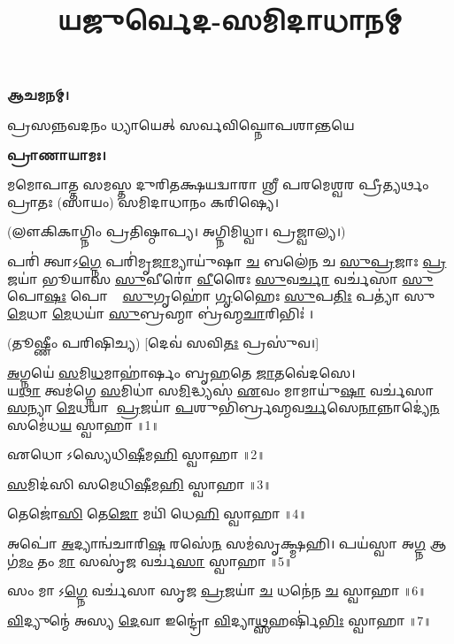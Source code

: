 \setmainfont[Scale=0.50,Script=Grantha,Mapping=tex-text,Mapping=devanagarinumerals,AutoFakeBold=2.0]{Noto Serif Grantha}
\title{\Huge 𑌯𑌜𑍁𑌰𑍍𑌵𑍇𑌦-𑌸𑌮𑌿𑌦𑌾𑌧𑌾𑌨𑌮𑍍}
\date{}
\maketitle
\tableofcontents 

\clearpage
{}

\textbf{𑌆𑌚𑌮𑌨𑌮𑍍।}

{𑌪𑍍𑌰𑌸𑌨𑍍𑌨𑌵𑌦𑌨𑌂 𑌧𑍍𑌯𑌾𑌯𑍇𑌤𑍍 𑌸𑌰𑍍𑌵𑌵𑌿𑌘𑍍𑌨𑍋𑌪𑌶𑌾𑌨𑍍𑌤𑌯𑍇}
 
\textbf{𑌪𑍍𑌰𑌾𑌣𑌾𑌯𑌾𑌮𑌃।} 

𑌮𑌮𑍋𑌪𑌾𑌤𑍍𑌤 𑌸𑌮𑌸𑍍𑌤 𑌦𑍁𑌰𑌿𑌤𑌕𑍍𑌷𑌯𑌦𑍍𑌵𑌾𑌰𑌾 𑌶𑍍𑌰𑍀 𑌪𑌰𑌮𑍇𑌶𑍍𑌵𑌰 𑌪𑍍𑌰𑍀𑌤𑍍𑌯𑌰𑍍𑌥𑌂 𑌪𑍍𑌰𑌾𑌤𑌃 (𑌸𑌾𑌯𑌂) 𑌸𑌮𑌿𑌦𑌾𑌧𑌾𑌨𑌂 𑌕𑌰𑌿𑌷𑍍𑌯𑍇।

(𑌲𑍗𑌕𑌿𑌕𑌾𑌗𑍍𑌨𑌿𑌂 𑌪𑍍𑌰𑌤𑌿𑌷𑍍𑌠𑌾𑌪𑍍𑌯। 𑌅𑌗𑍍𑌨𑌿𑌮𑌿𑌧𑍍𑌵𑌾। 𑌪𑍍𑌰𑌜𑍍𑌵𑌾𑌲𑍍𑌯।)

𑌪𑌰𑌿॑ 𑌤𑍍𑌵𑌾𑌽\ul{𑌗𑍍𑌨𑍇} 𑌪𑌰𑌿॑𑌮𑍃\ul{𑌜𑌾}𑌮𑍍𑌯𑌾𑌯𑍁॑𑌷𑌾 \ul{𑌚} 𑌬𑌲𑍇॑𑌨 𑌚 \ul{𑌸𑍁}\ul{𑌪𑍍𑌰}𑌜𑌾𑌃 \ul{𑌪𑍍𑌰}𑌜𑌯𑌾॑ 𑌭𑍂𑌯𑌾𑌸 \ul{𑌸𑍁}𑌵𑍀𑌰𑍋॑ \ul{𑌵𑍀}𑌰𑍈𑌃 \ul{𑌸𑍁}𑌵\ul{𑌰𑍍𑌚𑌾} 𑌵𑌰𑍍𑌚॑𑌸𑌾 \ul{𑌸𑍁}𑌪𑍋\ul{𑌷𑌃} 𑌪𑍋𑌷𑍈𑌃᳚ \ul{𑌸𑍁}𑌗𑍃𑌹𑍋॑ \ul{𑌗𑍃}𑌹𑍈𑌃 \ul{𑌸𑍁}𑌪\ul{𑌤𑌿𑌃} 𑌪𑌤𑍍𑌯𑌾॑ 𑌸𑍁\ul{𑌮𑍇}𑌧𑌾 \ul{𑌮𑍇}𑌧𑌯𑌾॑ \ul{𑌸𑍁}𑌬𑍍𑌰𑌹𑍍𑌮𑌾 𑌬𑍍𑌰॑𑌹𑍍𑌮\ul{𑌚𑌾}𑌰𑌿𑌭𑌿𑌃॑ ।

(𑌤𑍂𑌷𑍍𑌣𑍀𑌂 𑌪𑌰𑌿𑌷𑌿𑌚𑍍𑌯) [𑌦𑍇𑌵॑ 𑌸𑌵𑌿\ul{𑌤𑌃} 𑌪𑍍𑌰𑌸𑍁॑𑌵।]

\ul{𑌅}𑌗𑍍𑌨𑌯𑍇॑ \ul{𑌸}𑌮𑌿\ul{𑌧}𑌮𑌾𑌹𑌾॑𑌰𑍍\mbox{}𑌷𑌂 𑌬𑍃\ul{𑌹}𑌤𑍇 \ul{𑌜𑌾}𑌤𑌵𑍇॑𑌦𑌸𑍇।\\
𑌯\ul{𑌥𑌾} 𑌤𑍍𑌵𑌮॑𑌗𑍍𑌨𑍇 \ul{𑌸}𑌮𑌿𑌧𑌾॑ 𑌸\ul{𑌮𑌿}𑌦𑍍𑌧𑍍𑌯𑌸॑ \ul{𑌏}𑌵𑌂 𑌮𑌾𑌮𑌾𑌯𑍁॑\ul{𑌷𑌾} 𑌵𑌰𑍍𑌚॑𑌸𑌾 \ul{𑌸}𑌨𑍍𑌯𑌾 \ul{𑌮𑍇}𑌧𑌯𑌾 \ul{𑌪𑍍𑌰}𑌜𑌯𑌾॑ \ul{𑌪}𑌶𑍁𑌭𑌿॑𑌰𑍍𑌬𑍍𑌰𑌹𑍍𑌮𑌵\ul{𑌰𑍍𑌚}𑌸𑍇\ul{𑌨𑌾}𑌨𑍍𑌨𑌾𑌦𑍍𑌯𑍇॑\ul{𑌨} 𑌸𑌮𑍇॑𑌧\ul{𑌯} 𑌸𑍍𑌵𑌾𑌹𑌾॥1॥

𑌏𑌧𑍋𑌽𑌸𑍍𑌯𑍇𑌧𑌿\ul{𑌷𑍀}𑌮\ul{𑌹𑌿} 𑌸𑍍𑌵𑌾𑌹𑌾॥2॥

\ul{𑌸}𑌮𑌿𑌦॑𑌸𑌿 𑌸𑌮𑍇𑌧𑌿\ul{𑌷𑍀}𑌮\ul{𑌹𑌿} 𑌸𑍍𑌵𑌾𑌹𑌾॥3॥

𑌤𑍇𑌜𑍋॑\ul{𑌸𑌿} 𑌤𑍇\ul{𑌜𑍋} 𑌮𑌯𑌿॑ 𑌧𑍇\ul{𑌹𑌿} 𑌸𑍍𑌵𑌾𑌹𑌾॥4॥

𑌅𑌪𑍋॑ \ul{𑌅}𑌦𑍍𑌯𑌾𑌨𑍍𑌵॑𑌚𑌾𑌰𑌿\ul{𑌷}\ul{} 𑌰𑌸𑍇॑\ul{𑌨} 𑌸𑌮॑𑌸𑍃𑌕𑍍𑌷𑍍𑌮𑌹𑌿। 𑌪𑌯॑𑌸𑍍𑌵𑌾 𑌅\ul{𑌗𑍍𑌨} 𑌆𑌗॑\ul{𑌮𑌂} 𑌤𑌂 \ul{𑌮𑌾} 𑌸𑌸𑍃॑\ul{𑌜} 𑌵𑌰𑍍𑌚॑\ul{𑌸𑌾} 𑌸𑍍𑌵𑌾𑌹𑌾॥5॥

𑌸𑌂 𑌮𑌾𑌽\ul{𑌗𑍍𑌨𑍇} 𑌵𑌰𑍍𑌚॑𑌸𑌾 𑌸𑍃𑌜 \ul{𑌪𑍍𑌰}𑌜𑌯𑌾॑ \ul{𑌚} 𑌧𑌨𑍇॑𑌨 \ul{𑌚} 𑌸𑍍𑌵𑌾𑌹𑌾॥6॥

\ul{𑌵𑌿}𑌦𑍍𑌯𑍁𑌨𑍍𑌮𑍇॑ 𑌅𑌸𑍍𑌯 \ul{𑌦𑍇}𑌵𑌾 𑌇𑌨𑍍𑌦𑍍𑌰𑍋॑ \ul{𑌵𑌿}𑌦𑍍𑌯𑌾\ul{𑌥𑍍𑌸}𑌹𑌰𑍍\mbox{}𑌷𑌿॑\ul{𑌭𑌿𑌃} 𑌸𑍍𑌵𑌾𑌹𑌾॥7॥

